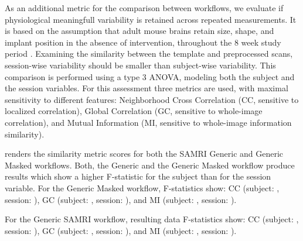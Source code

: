 As an additional metric for the comparison between workflows, we evaluate if physiological meaningfull variability is retained across repeated measurements.
It is based on the assumption that adult mouse brains retain size, shape, and implant position in the absence of intervention, throughout the 8 week study period \cite{ioanas_optimized_2019}.
Examining the similarity between the template and preprocessed scans, session-wise variability should be smaller than subject-wise variability.
This comparison is performed using a type 3 ANOVA, modeling both the subject and the session variables.
For this assessment three metrics are used, with maximal sensitivity to different features:
Neighborhood Cross Correlation (CC, sensitive to localized correlation),
Global Correlation (GC, sensitive to whole-image correlation),
and Mutual Information (MI, sensitive to whole-image information similarity).

 renders the similarity metric scores for both the SAMRI Generic and Generic Masked workflows.
Both, the Generic and the Generic Masked workflow produce results which show a higher F-statistic for the subject than for the session variable.
For the Generic Masked workflow, F-statistics show:
CC (subject: , session: ),
GC (subject: , session: ),
and MI (subject: , session: ).

For the Generic SAMRI workflow, resulting data F-statistics show:
CC (subject: , session: ),
GC (subject: , session: ),
and MI (subject: , session: ).
